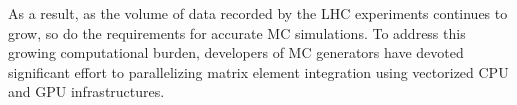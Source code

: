 


As a result, as the volume of data recorded by the LHC experiments continues to grow, so do the requirements for accurate MC simulations. To address this growing computational burden, developers of MC generators have devoted significant effort to parallelizing matrix element integration using vectorized CPU and GPU infrastructures.

